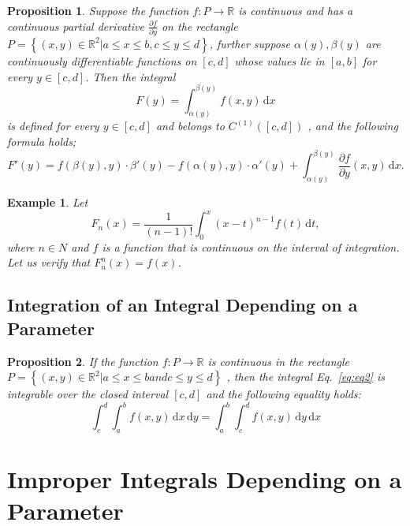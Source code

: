 \documentclass[a4paper,12pt]{article}
\newtheorem{example}{Example}             %
\newtheorem{proposition}{Proposition}
\begin{document}
\begin{CJK}{UTF8}{gbsn}
    \begin{proposition}
        Suppose the function $f: P \to \mathbb{R}$ is continuous and has a 
        continuous partial derivative  $\frac{\partial f}{\partial y}$ on the rectangle $P = \left\{ \left(x,y\right)
        \in \mathbb{R}^2 \vert a \le x \le b, c \le y \le d\right\}$, further suppose 
        $\alpha(y), \beta(y)$ are continuously differentiable functions on 
        $[c,d]$ whose values lie in $[a,b]$ for every $y \in [c,d]$. Then the integral 
        \[
            F(y) = \int_{\alpha(y)}^{\beta(y)}f(x,y)\, \mathrm{d}x
        \]
        is defined for every $y \in [c,d]$ and belongs to $C^{(1)} \left([c,d]\right)$
        , and the following formula holds;
        \[
            F'(y) = f(\beta(y),y)\cdot\beta'(y) - f(\alpha(y),y)\cdot\alpha'(y) 
            + \int_{\alpha(y)}^{\beta(y)}\frac{\partial f}{\partial y}(x,y)\,
            \mathrm{d}x.
        \]
    \end{proposition}

    \begin{example}
        Let 
        \[
            F_n(x) = \frac{1}{(n-1)!}\int_0^x(x-t)^{n-1}f(t)\, \mathrm{d}t,
        \]
        where $n \in N$ and $f$ is a function that is continuous on the interval 
        of integration. Let us verify that $F_n^{n}(x) = f(x)$.
    \end{example}

    \subsection{Integration of an Integral Depending on a Parameter}
    \begin{proposition}
        If the function $f: P \to \mathbb{R}$ is continuous in the rectangle 
        $P = \left\{\left(x,y\right) \in \mathbb{R}^2 \vert a \le x \le b and 
        c \le y \le d \right\}$ , then the integral Eq.~\ref{eq:eq2} is integrable over 
        the closed interval $[c,d]$ and the following equality holds:
        \begin{equation}
            \int_c^d\int_a^bf(x,y)\,\mathrm{d}x\,\mathrm{d}y =
            \int_a^b\int_c^df(x,y)\,\mathrm{d}y\,\mathrm{d}x
            \label{eq:eq3}
        \end{equation}
    \end{proposition}

    \section{Improper Integrals Depending on a Parameter}

\end{CJK}
\end{document}
